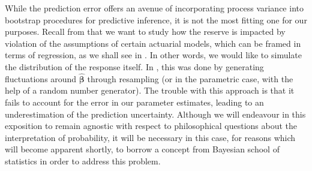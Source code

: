 \documentclass[a4paper]{book}
\begin{document}
While the prediction error offers an avenue of incorporating process variance into bootstrap procedures for predictive inference, it is not the most fitting one for our purposes. Recall from  that we want to study how the reserve is impacted by violation of the assumptions of certain actuarial models, which can be framed in terms of regression, as we shall see in . In other words, we would like to simulate the distribution of the response itself. In , this was done by generating fluctuations around $\widehat{\bm{\beta}}$ through resampling (or in the parametric case, with the help of a random number generator). The trouble with this approach is that it fails to account for the error in our parameter estimates, leading to an underestimation of the prediction uncertainty. Although we will endeavour in this exposition to remain agnostic with respect to philosophical questions about the interpretation of probability, it will be necessary in this case, for reasons which will become apparent shortly, to borrow a concept from Bayesian school of statistics in order to address this problem.
\end{document}
